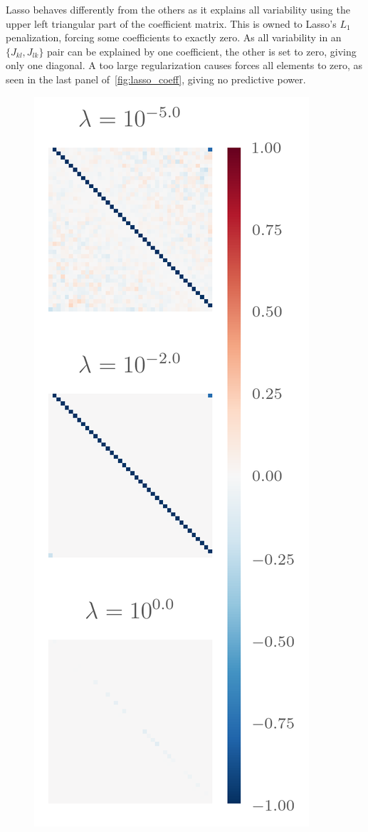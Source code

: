 Lasso behaves differently from the others as it explains all variability using
the upper left triangular part of the coefficient matrix. This is owned to
Lasso's \(L_{1}\) penalization, forcing some coefficients to exactly zero. As
all variability in an \(\{J_{kl}, J_{lk}\}\) pair can be explained by one
coefficient, the other is set to zero, giving only one diagonal. A too large
regularization causes forces all elements to zero, as seen in the last panel
of~\cref{fig:lasso_coeff},  giving no predictive power.

\begin{figure}[H]
  \centering
  \includegraphics[]{figures/lasso_coeff.png}

\end{figure}

